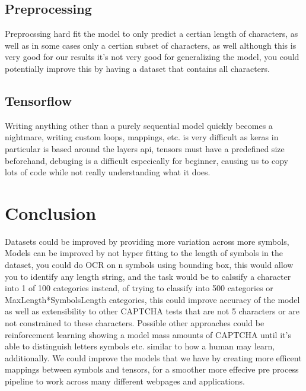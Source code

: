 \documentclass[11pt]{article}
\begin{document}
\subsection{Preprocessing}
Preprocssing hard fit the model to only predict a certian length of characters, as well as in some cases only a certian subset of characters, as well although this is very good for our results it's not very good for generalizing the model, you could potentially improve this by having a dataset that contains all characters.

\subsection{Tensorflow}
Writing anything other than a purely sequential model quickly becomes a nightmare, writing custom loops, mappings, etc. is very difficult as keras in particular is based around the layers api, tensors must have a predefined size beforehand, debuging is a difficult especically for beginner, causing us to copy lots of code while not really understanding what it does.

\section{Conclusion}
Datasets could be improved by providing more variation across more symbols, Models can be improved by not hyper fitting to the length of symbols in the dataset, you could do OCR on n symbols using bounding box, this would allow you to identify any length string, and the task would be to calssify a character into 1 of 100 categories instead, of trying to classify into 500 categories or MaxLength*SymbolsLength categories, this could improve accuracy of the model as well as extensibility to other CAPTCHA tests that are not 5 characters or are not constrained to these characters. Possible other approaches could be reinforcement learning showing a model mass amounts of CAPTCHA until it's able to distinguish letters symbols etc. similar to how a human may learn, additionally. We could improve the models that we have by creating more efficent mappings between symbols and tensors, for a smoother more effecive pre process pipeline to work across many different webpages and applications.

{}

\end{document}
